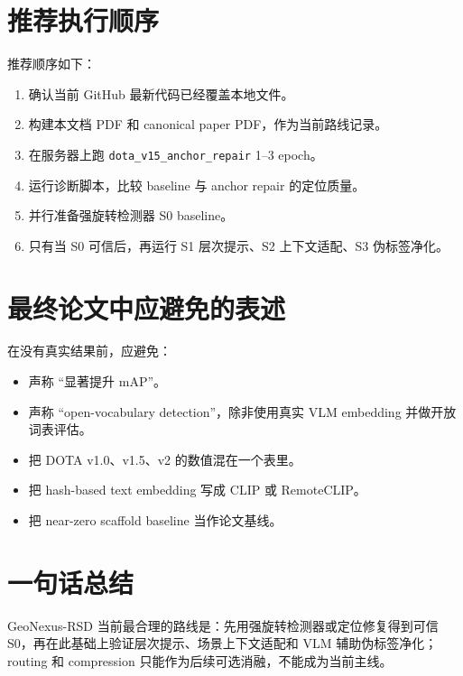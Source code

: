 \documentclass[11pt,a4paper]{ctexart}
\begin{document}
\section{推荐执行顺序}

推荐顺序如下：
\begin{enumerate}
  \item 确认当前 GitHub 最新代码已经覆盖本地文件。
  \item 构建本文档 PDF 和 canonical paper PDF，作为当前路线记录。
  \item 在服务器上跑 \texttt{dota\_v15\_anchor\_repair} 1--3 epoch。
  \item 运行诊断脚本，比较 baseline 与 anchor repair 的定位质量。
  \item 并行准备强旋转检测器 S0 baseline。
  \item 只有当 S0 可信后，再运行 S1 层次提示、S2 上下文适配、S3 伪标签净化。
\end{enumerate}

\section{最终论文中应避免的表述}

在没有真实结果前，应避免：
\begin{itemize}
  \item 声称 ``显著提升 mAP''。
  \item 声称 ``open-vocabulary detection''，除非使用真实 VLM embedding 并做开放词表评估。
  \item 把 DOTA v1.0、v1.5、v2 的数值混在一个表里。
  \item 把 hash-based text embedding 写成 CLIP 或 RemoteCLIP。
  \item 把 near-zero scaffold baseline 当作论文基线。
\end{itemize}

\section{一句话总结}

GeoNexus-RSD 当前最合理的路线是：先用强旋转检测器或定位修复得到可信 S0，再在此基础上验证层次提示、场景上下文适配和 VLM 辅助伪标签净化；routing 和 compression 只能作为后续可选消融，不能成为当前主线。
\end{document}
